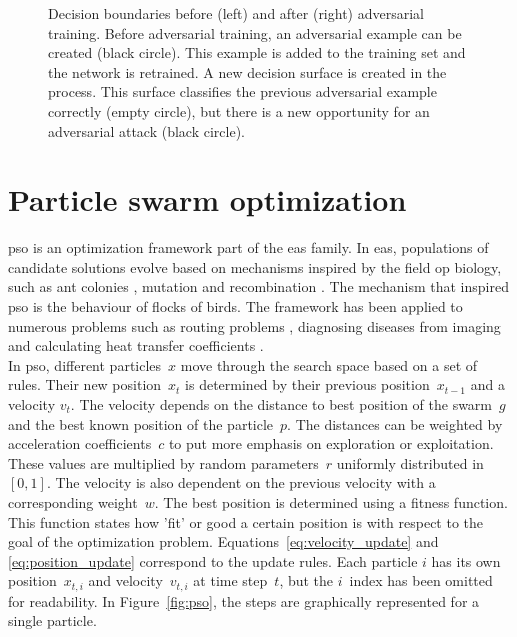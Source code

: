 \begin{figure}
\begin{tikzpicture}[x=0.75pt,y=0.75pt,yscale=-1,xscale=1]
\end{tikzpicture}
\caption[Adversarial training]{Decision boundaries before (left) and after (right) adversarial training. Before adversarial training, an adversarial example can be created (black circle). This example is added to the training set and the network is retrained. A new decision surface is created in the process. This surface classifies the previous adversarial example correctly (empty circle), but there is a new opportunity for an adversarial attack (black circle).}
\label{fig:adversarial_training}
\end{figure}


\section{Particle swarm optimization}
\gls{pso} \cite{pso} is an optimization framework part of the \glspl{ea} family. In \glspl{ea}, populations of candidate solutions evolve based on mechanisms inspired by the field op biology, such as ant colonies \cite{aco}, mutation and recombination \cite{genetic_algorithm}. The mechanism that inspired \gls{pso} is the behaviour of flocks of birds. The framework has been applied to numerous problems such as routing problems \cite{ev_transport, freight_transport}, diagnosing diseases from imaging \cite{leukemia_pso} and calculating heat transfer coefficients \cite{heat_transfer_pso}.\\

In \gls{pso}, different particles~$x$ move through the search space based on a set of rules. Their new position~$x_t$ is determined by their previous position~$x_{t-1}$ and a velocity $v_t$. The velocity depends on the distance to best position of the swarm~$g$ and the best known position of the particle~$p$. The distances can be weighted by acceleration coefficients~$c$ to put more emphasis on exploration or exploitation. These values are multiplied by random parameters~$r$ uniformly distributed in~$[0,1]$. The velocity is also dependent on the previous velocity with a corresponding weight~$w$. The best position is determined using a fitness function. This function states how 'fit' or good a certain position is with respect to the goal of the optimization problem. Equations~\ref{eq:velocity_update} and \ref{eq:position_update} correspond to the update rules. Each particle $i$ has its own position~$x_{t,i}$ and velocity~$v_{t,i}$ at time step~$t$, but the $i$~index has been omitted for readability. In Figure~\ref{fig:pso}, the steps are graphically represented for a single particle.

